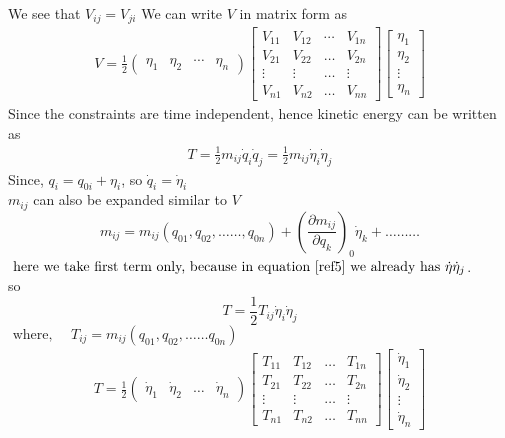  We see that $V_{i j}=V_{j i}$
 We can write $V$ in matrix form as
\begin{align}
 V=\frac{1}{2}\left(\begin{array}{llll}
\eta_{1} & \eta_{2} & \cdots & \eta_{n}
\end{array}\right)\left[\begin{array}{cccc}
V_{11} & V_{12} & \cdots & V_{1 n} \\
V_{21} & V_{22} & \ldots & V_{2 n} \\
\vdots & \vdots & \ldots & \vdots \\
V_{n 1} & V_{n 2} & \ldots & V_{n n}
\end{array}\right]\left[\begin{array}{l}
\eta_{1} \\
\eta_{2} \\
\vdots \\
\eta_{n}
\end{array}\right]\label{ref4}
\end{align}
Since the constraints are time independent, hence kinetic energy can be written as
\begin{align}
T=\frac{1}{2} m_{i j} \dot{q}_{i} \dot{q}_{j}=\frac{1}{2} m_{i j} \dot{\eta}_{i} \dot{\eta}_{j}\label{ref5}
\end{align}
Since, $q_{i}=q_{0 i}+\eta_{i}$, so $\dot{q}_{i}=\dot{\eta}_{i}$\\
$m_{i j}$ can also be expanded similar to $V$
$$m_{i j}=m_{i j}\left(q_{01}, q_{02}, \ldots \ldots, q_{0 n}\right)+\left(\frac{\partial m_{i j}}{\partial q_{k}}\right)_{0} \dot{\eta}_{k}+\ldots \ldots \ldots$$
$\text { here we take first term only, because in equation $\ref{ref5}$ we already has } \dot{\eta} \dot{\eta}_{j} $.\\
so
\begin{equation}
T=\frac{1}{2} T_{i j} \dot{\eta}_{i} \dot{\eta}_{j}\label{ref6}
\end{equation}
$\text { where, } \quad T_{i j}=m_{i j}\left(q_{01}, q_{02}, \ldots \ldots q_{0 n}\right)$\\
\begin{align}
 T=\frac{1}{2}\left(\begin{array}{llll}
\dot{\eta}_{1} & \dot{\eta}_{2} & \ldots & \dot{\eta}_{n}
\end{array}\right)\left[\begin{array}{cccc}
T_{11} & T_{12} & \ldots & T_{1 n} \\
T_{21} & T_{22} & \ldots & T_{2 n} \\
\vdots & \vdots & \ldots & \vdots \\
T_{n 1} & T_{n 2} & \ldots & T_{n n}
\end{array}\right]\left[\begin{array}{l}
\dot{\eta}_{1} \\
\dot{\eta}_{2} \\
\vdots \\
\dot{\eta}_{n}
\end{array}\right]\label{ref7}
\end{align}
